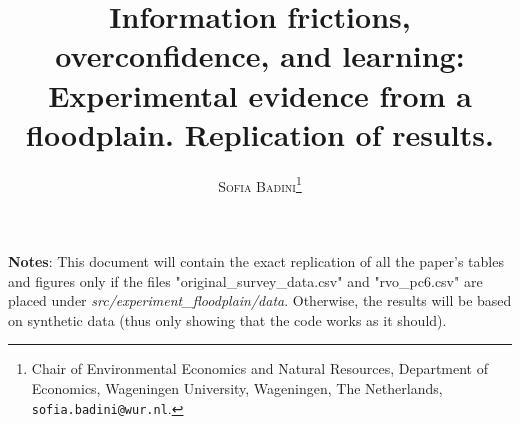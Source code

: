 \documentclass[12pt, a4paper, leqno]{article}
\title{\large Information frictions, overconfidence, and learning: Experimental evidence from a floodplain. Replication of results.}
\author{\normalsize \textsc{Sofia Badini\footnote{Chair of Environmental Economics and Natural Resources, Department of Economics, Wageningen University, Wageningen, The Netherlands, \texttt{sofia.badini@wur.nl}.}}}
\date{}
\begin{document}
\maketitle

\textbf{Notes}: This document will contain the exact replication of all the paper's tables and figures only if the files "original\_survey\_data.csv" and "rvo\_pc6.csv" are placed under \textit{src\slash experiment\_floodplain\slash data}. Otherwise, the results will be based on synthetic data (thus only showing that the code works as it should).

\newpage



\printbibliography[title=References]

\newpage
\renewcommand{\baselinestretch}{1.3}

\end{document}
